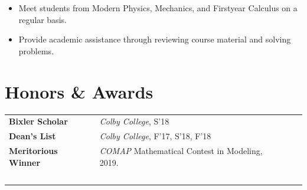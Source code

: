 \documentclass[a4paper, 10.5pt]{article}
\begin{document}
	\begin{itemize}[noitemsep, nolistsep]
		\setlength{\itemindent}{0.2in}
		\item Meet students from Modern Physics, Mechanics, and First\textendash year Calculus on a regular basis.
		\item Provide academic assistance through reviewing course material and solving problems.\\
	\end{itemize}

	\section*{\normalsize{{\color{colby}Honors \& Awards}}}
	\begin{tabular}{lp{13.5cm}lp{2in}}
		\textbf{Bixler Scholar} & \textit{Colby College}, S'18\textemdash \\
		\textbf{Dean's List} & \textit{Colby College}, F'17, S'18, F'18\\
		\textbf{Meritorious Winner} & \textit{COMAP} Mathematical Contest in Modeling, 2019. \\
		$\,$
	\end{tabular}
	
\end{document}
